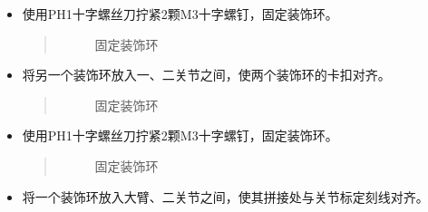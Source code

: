 \documentclass[a4paper,11pt,english,openany,oneside]{sphinxmanual}
\begin{document}
\begin{itemize}
\begin{itemize}
\begin{quote}
\begin{figure}[H]
\centering
\capstart

\noindent{}
\caption{固定装饰环}\label{\detokenize{_u66f4_u6362_u5173_u8282:id63}}\end{figure}
\end{quote}

\item {} 
\sphinxAtStartPar
使用PH1十字螺丝刀拧紧2颗M3十字螺钉，固定装饰环。
\begin{quote}

\begin{figure}[H]
\centering
\capstart

\noindent{}
\caption{固定装饰环}\label{\detokenize{_u66f4_u6362_u5173_u8282:id64}}\end{figure}
\end{quote}

\item {} 
\sphinxAtStartPar
将另一个装饰环放入一、二关节之间，使两个装饰环的卡扣对齐。
\begin{quote}

\begin{figure}[H]
\centering
\capstart

\noindent{}
\caption{固定装饰环}\label{\detokenize{_u66f4_u6362_u5173_u8282:id65}}\end{figure}
\end{quote}

\item {} 
\sphinxAtStartPar
使用PH1十字螺丝刀拧紧2颗M3十字螺钉，固定装饰环。
\begin{quote}

\begin{figure}[H]
\centering
\capstart

\noindent{}
\caption{固定装饰环}\label{\detokenize{_u66f4_u6362_u5173_u8282:id66}}\end{figure}
\end{quote}

\item {} 
\sphinxAtStartPar
将一个装饰环放入大臂、二关节之间，使其拼接处与关节标定刻线对齐。
\begin{quote}

\begin{figure}[H]
\centering
\capstart


\end{figure}
\end{quote}
\end{itemize}
\end{itemize}
\end{document}
